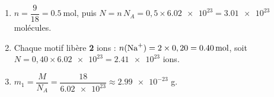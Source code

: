 \documentclass[11pt,a4paper]{article}
\begin{document}
\begin{corrige}
\begin{enumerate}[label=\alph*)]
  \item $n=\dfrac{9}{18}=\qty{0.5}{\mole}$, puis $N=n\,N_A=0,5\times\num{6.02e23}=\num{3.01e23}$ molécules.
  \item Chaque motif  libère \textbf{2} ions  : $n(\ce{Na+})=2\times0,20=\qty{0.40}{\mole}$,
        soit $N=0,40\times\num{6.02e23}=\num{2.41e23}$ ions.
  \item $m_1=\dfrac{M}{N_A}=\dfrac{18}{\num{6.02e23}}\approx\num{2.99e-23}$ \si{\gram}.
\end{enumerate}
\end{corrige}
\end{document}
